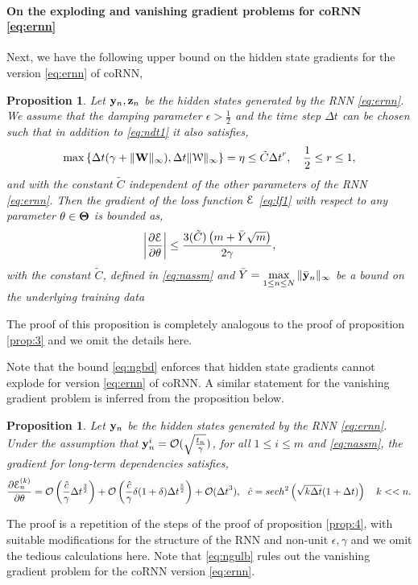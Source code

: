 \documentclass{article} \usepackage{iclr2021_conference,times}
\newtheorem{proposition}[theorem]{Proposition}
\newcommand{\cW}{\EuScript{W}}
\newcommand{\by}{{\bf y}}
\newcommand{\bz}{{\bf z}}
\newcommand{\bW}{{\bf W}}
\newcommand{\ep}{\epsilon}
\newcommand{\ord}{{\mathcal O}}
\newcommand{\Dt}{{\Delta t}}
\newcommand{\E}{\EuScript{E}}
\begin{document}
\paragraph{On the exploding and vanishing gradient problems for coRNN \eqref{eq:ernn}}
Next, we have the following upper bound on the hidden state gradients for the version \eqref{eq:ernn} of coRNN,
\begin{proposition}
\label{prop:n3}
Let $\by_n,\bz_n$ be the hidden states generated by the RNN \eqref{eq:ernn}. We assume that the damping parameter $\ep > \frac{1}{2}$ and the time step $\Dt$ can be chosen such that in addition to \eqref{eq:ndt1} it also satisfies, 
\begin{equation}
\label{eq:nassm}
\max \left\{\Dt (\gamma + \|\bW\|_{\infty}),  \Dt  \|{\bf \cW}\|_{\infty} \right \}  = \eta \leq \tilde{C}\Dt^r, \quad \frac{1}{2} \leq r \leq 1,  
\end{equation}
and with the constant $\tilde{C}$ independent of the other parameters of the RNN \eqref{eq:ernn}. Then the gradient of the loss function $\E$ \eqref{eq:lf1} with respect to any parameter $\theta \in {\bf \Theta}$ is bounded as,
\begin{equation}
    \label{eq:ngbd}
    \left| \frac{\partial \E}{\partial \theta} \right| \leq \frac{3(\tilde{C})\left(m+\bar{Y}\sqrt{m}\right)}{2\gamma},
\end{equation}
with the constant $\tilde{C}$, defined in \eqref{eq:nassm} and $\bar{Y} = \max\limits_{1 \leq n \leq N} \|\bar{\by}_n\|_{\infty}$ be a bound on the underlying training data
\end{proposition}
The proof of this proposition is completely analogous to the proof of proposition \ref{prop:3} and we omit the details here.

Note that the bound \eqref{eq:ngbd} enforces that hidden state gradients cannot explode for version \eqref{eq:ernn} of coRNN. A similar statement for the vanishing gradient problem is inferred from the proposition below.
\begin{proposition}
\label{prop:n4}
Let $\by_n$ be the hidden states generated by the RNN \eqref{eq:ernn}. Under the assumption that $\by^i_n = \ord(\sqrt{\frac{t_n}{\gamma}})$, for all $1 \leq i \leq m$ and \eqref{eq:nassm}, the gradient for long-term dependencies satisfies,
\begin{equation}
    \label{eq:ngulb}
    \frac{\partial \E^{(k)}_n}{\partial \theta} = \ord\left(\frac{\hat{c}}{\gamma}\Dt^{\frac{3}{2}}\right) + \ord\left(\frac{\hat{c}}{\gamma}\delta(1+\delta)\Dt^{\frac{5}{2}}\right) + \ord(\Dt^3),~~ \hat{c} = sech^2\left(\sqrt{k\Dt}(1+\Dt)\right)
     \quad k << n.
\end{equation}
\end{proposition}
The proof is a repetition of the steps of the proof of proposition \ref{prop:4}, with suitable modifications for the structure of the RNN and non-unit $\epsilon,\gamma$ and we omit the tedious calculations here. Note that \eqref{eq:ngulb} rules out the vanishing gradient problem for the coRNN version \eqref{eq:ernn}. 
\end{document}
